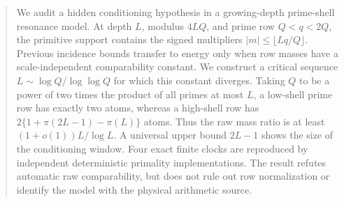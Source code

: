 \begin{abstract}
We audit a hidden conditioning hypothesis in a growing-depth prime-shell resonance
model.  At depth $L$, modulus $4LQ$, and prime row $Q<q<2Q$, the primitive support
contains the signed multipliers $|m|\le \lfloor Lq/Q\rfloor$.  Previous incidence
bounds transfer to energy only when row masses have a scale-independent comparability
constant.  We construct a critical sequence $L\sim\log Q/\log\log Q$ for which this
constant diverges.  Taking $Q$ to be a power of two times the product of all primes at
most $L$, a low-shell prime row has exactly two atoms, whereas a high-shell row has
$2\{1+\pi(2L-1)-\pi(L)\}$ atoms.  Thus the raw mass ratio is at least
$(1+o(1))L/\log L$.  A universal upper bound $2L-1$ shows the size of the conditioning
window.  Four exact finite clocks are reproduced by independent deterministic
primality implementations.  The result refutes automatic raw comparability, but does
not rule out row normalization or identify the model with the physical arithmetic
source.
\end{abstract}
